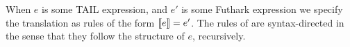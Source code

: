 \documentclass[11pt]{article}
\begin{document}
When $e$ is some TAIL expression, and $e'$ is some Futhark expression we specify the translation as rules of the form $\llbracket e \rrbracket = e'$. The rules of are syntax-directed in the sense that they follow the structure of $e$, recursively. 

\end{document}
